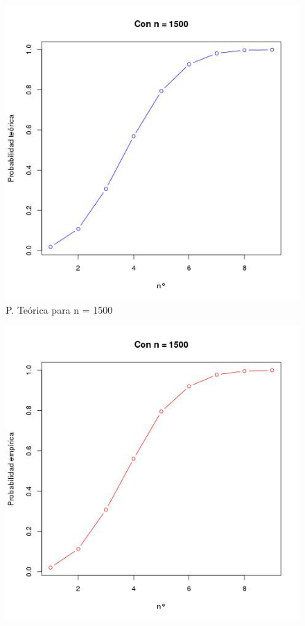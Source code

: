 \documentclass[letter,10pt]{article}
\begin{document}
\begin{itemize}
  \begin{minipage}{\linewidth}
      \centering
      \begin{minipage}{0.45\linewidth}
          \begin{figure}[H]
              \includegraphics[width=\linewidth]{p4_teo_1500.jpg}
              \caption{P. Te\'orica para n = 1500}
          \end{figure}
      \end{minipage}
      \hspace{0.05\linewidth}
      \begin{minipage}{0.45\linewidth}
          \begin{figure}[H]
              \includegraphics[width=\linewidth]{p4_emp_1500.jpg}

\end{figure}
\end{minipage}
\end{minipage}
\end{itemize}
\end{document}
